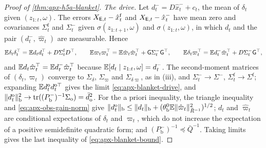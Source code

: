 \begin{proof}[Proof of \cref{thm:apx-h5a-blanket}]
\emph{The drive.} Let $d^-_t=D\hat x^-_t+c_t$, the mean of $\delta_t$ given $(z_{1:t},\omega)$. The errors $X_{\mathsf{E},t}-\hat x^{\mathrm f}_t$ and $X_{\mathsf{E},t}-\hat x^-_t$ have mean zero and covariances $\Sigma^{\mathrm f}_t$ and $\Sigma^-_t$ given $\sigma(z_{1:t+1},\omega)$ and $\sigma(z_{1:t},\omega)$, in which $d_t$ and the pair $(d^-_t,\hat\varpi_t)$ are measurable. Hence
\begin{equation*}
\mathbb{E}\delta_t\delta_t^\top=\mathbb{E} d_td_t^\top+D\Sigma^{\mathrm f}_tD^\top,\qquad\mathbb{E}\varpi_t\varpi_t^\top=\mathbb{E}\hat\varpi_t\hat\varpi_t^\top+\mathsf G\Sigma^-_t\mathsf G^\top,\qquad\mathbb{E}\delta_t\varpi_t^\top=\mathbb{E} d^-_t\hat\varpi_t^\top+D\Sigma^-_t\mathsf G^\top ,
\end{equation*}
and $\mathbb{E} d_t\hat\varpi_t^\top=\mathbb{E} d^-_t\hat\varpi_t^\top$ because $\mathbb{E}[d_t\mid z_{1:t},\omega]=d^-_t$. The second-moment matrices of $(\delta_t,\varpi_t)$ converge to $\Sigma_\delta$, $\Sigma_\varpi$ and $\Sigma_{\delta\varpi}$, as in (iii), and $\Sigma^-_t\to\Sigma^-$, $\Sigma^{\mathrm f}_t\to\Sigma^{\mathrm f}$; expanding $\mathbb{E} d^{\mathrm o}_td^{\mathrm o\top}_t$ gives the limit \eqref{eq:apx-blanket-drive}, and $\Vert d^{\mathrm o}_t\Vert_{\mathrm b}^2\to\operatorname{tr}((P^-_{\mathrm b})^{-1}\Sigma_{\mathrm o})=\bar d_{\mathrm o}^2$. For the a priori inequality, the triangle inequality and \eqref{eq:apx-obs-gain-norm} give $\Vert d^{\mathrm o}_t\Vert_{\mathrm b}\le\Vert d_t\Vert_{\mathrm b}+(\theta^0_{\mathrm b}\mathbb{E}\Vert\hat\varpi_t\Vert^2_{\bar R^{-1}})^{1/2}$; $d_t$ and $\hat\varpi_t$ are conditional expectations of $\delta_t$ and $\varpi_t$, which do not increase the expectation of a positive semidefinite quadratic form; and $(P^-_{\mathrm b})^{-1}\preceq\bar Q^{-1}$. Taking limits gives the last inequality of \eqref{eq:apx-blanket-bound}.


\end{proof}
